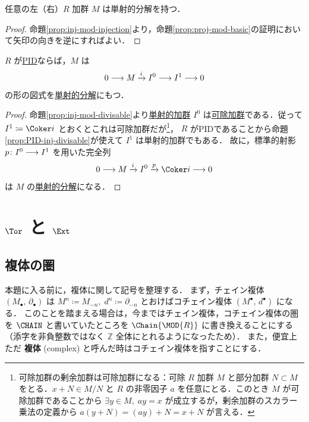 \documentclass[algtopo_main]{subfiles}
\begin{document}
\begin{myprop}[label=prop:inj-resol-basic]{}
    任意の左（右）$R$ 加群 $M$ は単射的分解を持つ．
\end{myprop}

\begin{proof}
    命題\ref{prop:inj-mod-injection}より，命題\ref{prop:proj-mod-basic}の証明において矢印の向きを逆にすればよい．
\end{proof}

\begin{mytheo}[]{}
    $R$ が\hyperref[def:PID]{PID}ならば，$M$ は
    \begin{align}
        0 \longrightarrow M \xrightarrow{i} I^0 \longrightarrow I^1 \longrightarrow 0
    \end{align}
    の形の図式を\hyperref[def:injective-resolution]{単射的分解}にもつ．
\end{mytheo}

\begin{proof}
    命題\ref{prop:inj-mod-divisable}より\hyperref[def:inj-mod]{単射的加群} $I^0$ は\hyperref[def:divisable-mod]{可除加群}である．従って $I^1 \coloneqq \Coker i$ とおくとこれは可除加群だが\footnote{可除加群の剰余加群は可除加群になる：可除 $R$ 加群 $M$ と部分加群 $N \subset M$ をとる．$x + N \in M/N$ と $R$ の非零因子 $a$ を任意にとる．このとき $M$ が可除加群であることから $\exists y \in M,\; ay = x$ が成立するが，剰余加群のスカラー乗法の定義から $a(y+N) = (ay) + N = x+ N$ が言える．}，
    $R$ がPIDであることから命題\ref{prop:PID-inj-divisable}が使えて $I^1$ は単射的加群でもある．
    故に，標準的射影 $p \colon I^0 \longrightarrow I^1$ を用いた完全列
    \begin{align}
        0 \lto M \xrightarrow{i} I^0 \xrightarrow{p} \Coker i \lto 0
    \end{align}
    は $M$ の\hyperref[def:injective-resolution]{単射的分解}になる．
\end{proof}


\section{$\Tor$ と $\Ext$}


\subsection{複体の圏}

本題に入る前に，複体に関して記号を整理する．
まず，チェイン複体 $(M_\bullet,\, \partial_\bullet)$ は $M^n \coloneqq M_{-n},\; d^n \coloneqq \partial_{-n}$ とおけばコチェイン複体 $(M^\bullet,\, d^\bullet)$ になる．
このことを踏まえる場合は，今まではチェイン複体，コチェイン複体の圏を $\CHAIN$ と書いていたところを $\Chain{\MOD{R}}$ に書き換えることにする（添字を非負整数ではなく $\mathbb{Z}$ 全体にとれるようになったため）．
また，便宜上ただ \textbf{複体} (complex) と呼んだ時はコチェイン複体を指すことにする．
\end{document}
